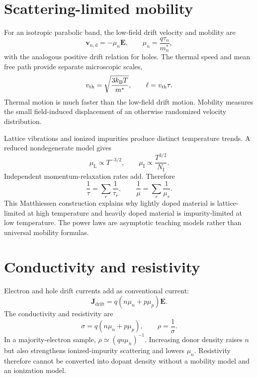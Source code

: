 \section{Scattering-limited mobility}

For an isotropic parabolic band, the low-field drift velocity and mobility are
\begin{equation}
  \bm v_{n,\mathrm d}=-\mu_n\bm E,
  \qquad
  \mu_n=\frac{q\tau_n}{m_n^*},
  \label{eq:measured-electron-mobility}
\end{equation}
with the analogous positive drift relation for holes.  The thermal speed and
mean free path provide separate microscopic scales,
\begin{equation}
  v_{\mathrm{th}}=\sqrt{\frac{3k_{\mathrm B} T}{m^*}},
  \qquad
  \ell=v_{\mathrm{th}}\tau.
  \label{eq:transport-thermal-speed-path}
\end{equation}
Thermal motion is much faster than the low-field drift motion.  Mobility
measures the small field-induced displacement of an otherwise randomized
velocity distribution.

Lattice vibrations and ionized impurities produce distinct temperature trends.
A reduced nondegenerate model gives
\begin{equation}
  \mu_{\mathrm L}\propto T^{-3/2},
  \qquad
  \mu_{\mathrm I}\propto \frac{T^{3/2}}{N_{\mathrm I}}.
  \label{eq:transport-mobility-power-laws}
\end{equation}
Independent momentum-relaxation rates add.  Therefore
\begin{equation}
  \frac1\tau=\sum_r\frac1{\tau_r},
  \qquad
  \boxed{\frac1\mu=\sum_r\frac1{\mu_r}.}
  \label{eq:transport-matthiessen}
\end{equation}
This Matthiessen construction explains why lightly doped material is
lattice-limited at high temperature and heavily doped material is
impurity-limited at low temperature.  The power laws are asymptotic teaching
models rather than universal mobility formulas.

\section{Conductivity and resistivity}

Electron and hole drift currents add as conventional current:
\begin{equation}
  \bm J_{\mathrm{drift}}
  =q(n\mu_n+p\mu_p)\bm E.
  \label{eq:transport-total-drift-current}
\end{equation}
The conductivity and resistivity are
\begin{equation}
  \boxed{\sigma=q(n\mu_n+p\mu_p),}
  \qquad
  \boxed{\rho=\frac1\sigma.}
  \label{eq:transport-conductivity-resistivity}
\end{equation}
In a majority-electron sample, $\rho\simeq(qn\mu_n)^{-1}$.  Increasing donor
density raises $n$ but also strengthens ionized-impurity scattering and lowers
$\mu_n$.  Resistivity therefore cannot be converted into dopant density without
a mobility model and an ionization model.

